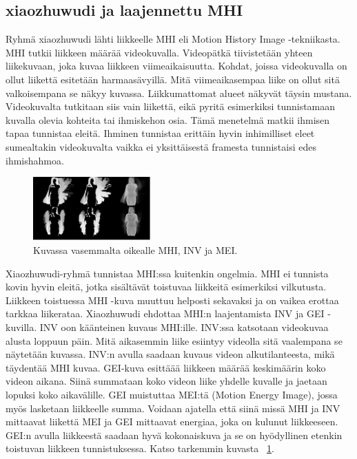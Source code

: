 \subsection{xiaozhuwudi ja laajennettu MHI}
Ryhmä xiaozhuwudi lähti liikkeelle MHI eli Motion History Image -tekniikasta. \citep {6239179} MHI tutkii liikkeen määrää videokuvalla.
Videopätkä tiivistetään yhteen liikekuvaan, joka kuvaa liikkeen viimeaikaisuutta. Kohdat, joissa videokuvalla on ollut
liikettä esitetään harmaasävyillä. Mitä viimeaikasempaa liike on ollut sitä valkoisempana se näkyy kuvassa. Liikkumattomat
alueet näkyvät täysin mustana. Videokuvalta tutkitaan siis vain liikettä, eikä pyritä esimerkiksi tunnistamaan kuvalla olevia kohteita
tai ihmiskehon osia. Tämä menetelmä matkii ihmisen tapaa tunnistaa eleitä. Ihminen tunnistaa erittäin hyvin inhimilliset eleet  
sumealtakin videokuvalta vaikka ei yksittäisestä framesta tunnistaisi edes ihmishahmoa. \citep {910878}  \\
\begin{figure}[htb]
  \begin{center}
    \includegraphics[width=0.4\textwidth]{mhi_ex.jpg}
    \caption{Kuvassa vasemmalta oikealle MHI, INV ja MEI. \citep {6239179}}
    \label{fig:mhiinvmei}
  \end{center}
\end{figure}
Xiaozhuwudi-ryhmä tunnistaa MHI:ssa kuitenkin ongelmia. MHI ei tunnista kovin hyvin eleitä, jotka sisältävät toistuvaa liikkeitä esimerkiksi vilkutusta.
Liikkeen toistuessa MHI -kuva muuttuu helposti sekavaksi ja on vaikea erottaa tarkkaa liikerataa. Xiaozhuwudi ehdottaa MHI:n laajentamista INV ja GEI -kuvilla.
INV oon käänteinen kuvaus MHI:ille. INV:ssa katsotaan videokuvaa alusta loppuun päin.
Mitä aikasemmin liike esiintyy videolla sitä vaalempana se näytetään kuvassa. INV:n avulla saadaan kuvaus videon alkutilanteesta, mikä täydentää MHI kuvaa. 
GEI-kuva esittäää liikkeen määrää keskimäärin koko videon aikana. Siinä summataan koko videon liike yhdelle kuvalle ja jaetaan lopuksi koko aikavälille.
GEI muistuttaa MEI:tä (Motion Energy Image), jossa myös lasketaan liikkeelle summa. Voidaan ajatella että siinä missä MHI ja INV mittaavat liikettä 
MEI ja GEI mittaavat energiaa, joka on kulunut liikkeeseen. GEI:n avulla liikkeestä saadaan hyvä kokonaiskuva ja se on hyödyllinen etenkin toistuvan
liikkeen tunnistuksessa. \citep {6239179} Katso tarkemmin kuvasta  ~\ref{fig:mhiinvmei}. \\

